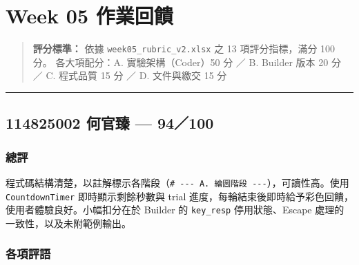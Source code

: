 \documentclass[14pt,]{extarticle}
\date{}
\begin{document}
\hypertarget{week-05-ux4f5cux696dux56deux994b}{%
\section{Week 05 作業回饋}\label{week-05-ux4f5cux696dux56deux994b}}

\begin{quote}
\textbf{評分標準：} 依據 \texttt{week05\_rubric\_v2.xlsx} 之 13
項評分指標，滿分 100 分。 各大項配分：A. 實驗架構（Coder）50 分 ／ B.
Builder 版本 20 分 ／ C. 程式品質 15 分 ／ D. 文件與繳交 15 分
\end{quote}

\begin{center}\rule{0.5\linewidth}{0.4pt}\end{center}

\hypertarget{ux4f55ux5b98ux81fb-94100}{%
\subsection{114825002 何官臻 ---
94／100}\label{ux4f55ux5b98ux81fb-94100}}

\hypertarget{ux7e3dux8a55}{%
\subsubsection{總評}\label{ux7e3dux8a55}}

程式碼結構清楚，以註解標示各階段（\texttt{\#\ -\/-\/-\ A.\ 繪圖階段\ -\/-\/-}），可讀性高。使用
\texttt{CountdownTimer} 即時顯示剩餘秒數與 trial
進度，每輪結束後即時給予彩色回饋，使用者體驗良好。小幅扣分在於 Builder
的 \texttt{key\_resp} 停用狀態、Escape 處理的一致性，以及未附範例輸出。

\hypertarget{ux5404ux9805ux8a55ux8a9e}{%
\subsubsection{各項評語}\label{ux5404ux9805ux8a55ux8a9e}}
\end{document}
